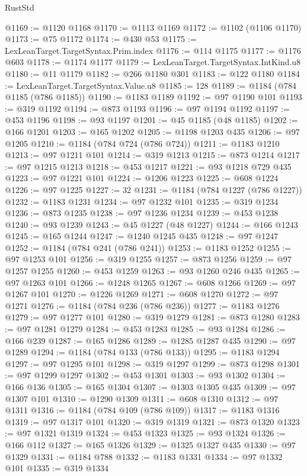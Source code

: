 \begin{lexlean}{RustStd}
\begin{coremodule}
@1169 := @1120 @1168
@1170 := @1113 @1169
@1172 := @1102 (@1106 @1170)
@1173 := @75 @1172
@1174 := @430 @53
@1175 := LexLeanTarget.TargetSyntax.Prim.index
@1176 := @114 @1175
@1177 := @1176 @603
@1178 := @1174 @1177
@1179 := LexLeanTarget.TargetSyntax.IntKind.u8
@1180 := @11 @1179
@1182 := @266 @1180 @301
@1183 := @122 @1180
@1184 := LexLeanTarget.TargetSyntax.Value.u8
@1185 := 128
@1189 := @1184 (@784 @1185 (@786 @1185))
@1190 := @1183 @1189
@1192 := @97 @1190 @101
@1193 := @319 @1192
@1194 := @873 @1193
@1196 := @97 @1194 @1192
@1197 := @453 @1196
@1198 := @93 @1197
@1201 := @45 @1185 (@48 @1185)
@1202 := @166 @1201
@1203 := @165 @1202
@1205 := @1198 @1203 @435
@1206 := @97 @1205
@1210 := @1184 (@784 @724 (@786 @724))
@1211 := @1183 @1210
@1213 := @97 @1211 @101
@1214 := @319 @1213
@1215 := @873 @1214
@1217 := @97 @1215 @1213
@1218 := @453 @1217
@1221 := @93 @1218 @729 @435
@1223 := @97 @1221 @101
@1224 := @1206 @1223
@1225 := @608 @1224
@1226 := @97 @1225
@1227 := 32
@1231 := @1184 (@784 @1227 (@786 @1227))
@1232 := @1183 @1231
@1234 := @97 @1232 @101
@1235 := @319 @1234
@1236 := @873 @1235
@1238 := @97 @1236 @1234
@1239 := @453 @1238
@1240 := @93 @1239
@1243 := @45 @1227 (@48 @1227)
@1244 := @166 @1243
@1245 := @165 @1244
@1247 := @1240 @1245 @435
@1248 := @97 @1247
@1252 := @1184 (@784 @241 (@786 @241))
@1253 := @1183 @1252
@1255 := @97 @1253 @101
@1256 := @319 @1255
@1257 := @873 @1256
@1259 := @97 @1257 @1255
@1260 := @453 @1259
@1263 := @93 @1260 @246 @435
@1265 := @97 @1263 @101
@1266 := @1248 @1265
@1267 := @608 @1266
@1269 := @97 @1267 @101
@1270 := @1226 @1269
@1271 := @608 @1270
@1272 := @97 @1271
@1276 := @1184 (@784 @236 (@786 @236))
@1277 := @1183 @1276
@1279 := @97 @1277 @101
@1280 := @319 @1279
@1281 := @873 @1280
@1283 := @97 @1281 @1279
@1284 := @453 @1283
@1285 := @93 @1284
@1286 := @166 @239
@1287 := @165 @1286
@1289 := @1285 @1287 @435
@1290 := @97 @1289
@1294 := @1184 (@784 @133 (@786 @133))
@1295 := @1183 @1294
@1297 := @97 @1295 @101
@1298 := @319 @1297
@1299 := @873 @1298
@1301 := @97 @1299 @1297
@1302 := @453 @1301
@1303 := @93 @1302
@1304 := @166 @136
@1305 := @165 @1304
@1307 := @1303 @1305 @435
@1309 := @97 @1307 @101
@1310 := @1290 @1309
@1311 := @608 @1310
@1312 := @97 @1311
@1316 := @1184 (@784 @109 (@786 @109))
@1317 := @1183 @1316
@1319 := @97 @1317 @101
@1320 := @319 @1319
@1321 := @873 @1320
@1323 := @97 @1321 @1319
@1324 := @453 @1323
@1325 := @93 @1324
@1326 := @166 @112
@1327 := @165 @1326
@1329 := @1325 @1327 @435
@1330 := @97 @1329
@1331 := @1184 @788
@1332 := @1183 @1331
@1334 := @97 @1332 @101
@1335 := @319 @1334

\end{coremodule}
\end{lexlean}
